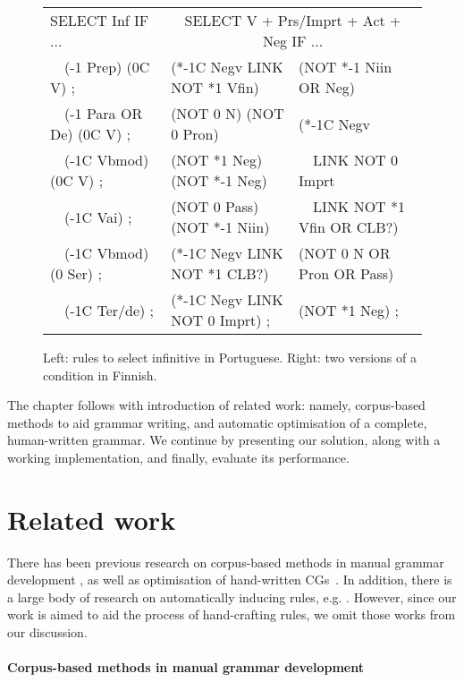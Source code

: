 \begin{figure}[t]
\ttfamily
\centering
\begin{tabular}{l | @{~~~} l  l}
SELECT Inf IF ... & \multicolumn{2}{c}{SELECT V + Prs/Imprt + Act + Neg IF ...} \\
~~(-1 Prep) (0C V) ;       & (*-1C Negv LINK NOT *1 Vfin)  & (NOT *-1 Niin OR Neg)  \\
~~(-1 Para OR De) (0C V) ; & (NOT 0 N) (NOT 0 Pron)        & (*-1C Negv \\
~~(-1C Vbmod) (0C V) ;     & (NOT *1 Neg) (NOT *-1 Neg)    &  ~~LINK NOT 0 Imprt \\
~~(-1C Vai) ;              & (NOT 0 Pass) (NOT *-1 Niin)   &  ~~LINK NOT *1 Vfin OR CLB?) \\
~~(-1C Vbmod) (0 Ser) ;    & (*-1C Negv LINK NOT *1 CLB?)  & (NOT 0 N OR Pron OR Pass) \\
~~(-1C Ter/de) ;           & (*-1C Negv LINK NOT 0 Imprt) ;  & (NOT *1 Neg) ; \\

\end{tabular}

\caption{Left: rules to select infinitive in Portuguese. 
        Right: two versions of a condition in Finnish.}

\label{fig:infrules}
\end{figure}

The chapter follows with introduction of related work: namely, corpus-based methods to aid grammar writing, and automatic optimisation of a complete, human-written grammar. We continue by presenting our solution, along with a working implementation, and finally, evaluate its performance.

\section{Related work}
\label{sec:CGanaRelated}

There has been previous research on corpus-based methods in manual grammar development \cite{voutilainen2004}, as well as optimisation of hand-written CGs~\cite{bick2013tuning}.
In addition, there is a large body of research on automatically
inducing rules, e.g. \cite{inducing_cg1996,lindberg_eineborg98ilp,lager01transformation,asfrent14}.
However, since our work is aimed to aid the process of hand-crafting rules, we omit those works from our discussion.


\paragraph{Corpus-based methods in manual grammar development}

